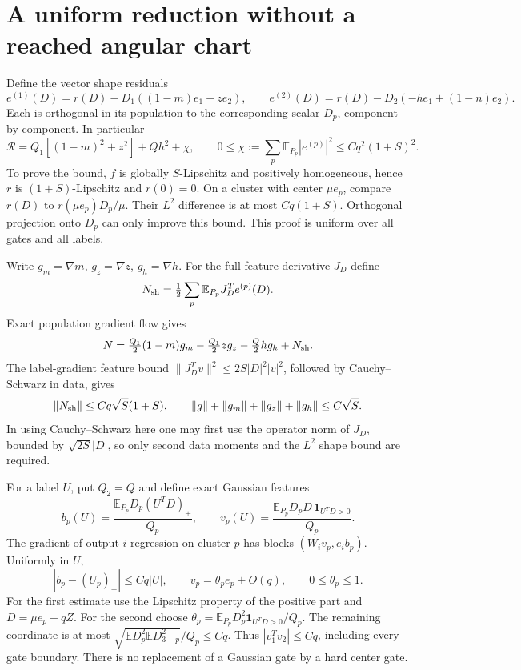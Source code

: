 \documentclass[11pt]{article}
\newcommand{\E}{\mathbb E}
\begin{document}
\section{A uniform reduction without a reached angular chart}
Define the vector shape residuals
\[
 e^{(1)}(D)=r(D)-D_1((1-m)e_1-z e_2),\qquad
 e^{(2)}(D)=r(D)-D_2(-h e_1+(1-n)e_2).
\]
Each is orthogonal in its population to the corresponding scalar
$D_p$, component by component. In particular
\begin{equation}\label{an04recv1:shapes}
 \mathcal R=Q_1[(1-m)^2+z^2]+Qh^2+\chi,
 \qquad
 0\le\chi:=\sum_p\E_{P_p}|e^{(p)}|^2
 \le Cq^2(1+S)^2.
\end{equation}
To prove the bound, $f$ is globally $S$-Lipschitz and positively
homogeneous, hence $r$ is $(1+S)$-Lipschitz and $r(0)=0$.
On a cluster with center $\mu e_p$, compare $r(D)$ to
$r(\mu e_p)D_p/\mu$. Their $L^2$ difference is at most
$Cq(1+S)$. Orthogonal projection onto $D_p$ can only improve
this bound. This proof is uniform over all gates and all labels.

Write $g_m=\nabla m$, $g_z=\nabla z$, $g_h=\nabla h$.
For the full feature derivative $J_D$ define
\[
 N_{\rm sh}=\tfrac12\sum_p\E_{P_p}J_D^Te^{(p)}(D).
\]
Exact population gradient flow gives
\begin{equation}\label{an04recv1:four}
 N=\tfrac{Q_1}{2}(1-m)g_m-\tfrac{Q_1}{2}z g_z
             -\tfrac Q2 h g_h+N_{\rm sh}.
\end{equation}
The label-gradient feature bound
$\|J_D^Tv\|^2\le2S|D|^2|v|^2$, followed by
Cauchy--Schwarz in data, gives
\[
 \|N_{\rm sh}\|\le Cq\sqrt S(1+S),\qquad
 \|g\|+\|g_m\|+\|g_z\|+\|g_h\|\le C\sqrt S.
\]
In using Cauchy--Schwarz here one may first use the operator norm
of $J_D$, bounded by $\sqrt{2S}|D|$, so only second data moments
and the $L^2$ shape bound are required.

For a label $U$, put $Q_2=Q$ and define exact Gaussian features
\[
 b_p(U)=\frac{\E_{P_p}D_p(U^TD)_+}{Q_p},\qquad
 v_p(U)=\frac{\E_{P_p}D_pD\,\mathbf1_{U^TD>0}}{Q_p}.
\]
The gradient of output-$i$ regression on cluster $p$ has blocks
$(W_i v_p,e_i b_p)$. Uniformly in $U$,
\begin{equation}\label{an04recv1:features}
 |b_p-(U_p)_+|\le Cq|U|,\qquad
 v_p=\theta_p e_p+O(q),\qquad 0\le\theta_p\le1.
\end{equation}
For the first estimate use the Lipschitz property of the positive
part and $D=\mu e_p+qZ$. For the second choose
$\theta_p=\E_{P_p}D_p^2\mathbf1_{U^TD>0}/Q_p$.
The remaining coordinate is at most
$\sqrt{\E D_p^2\E D_{3-p}^2}/Q_p\le Cq$.
Thus $|v_1^Tv_2|\le Cq$, including every gate boundary.
There is no replacement of a Gaussian gate by a hard center gate.
\end{document}
